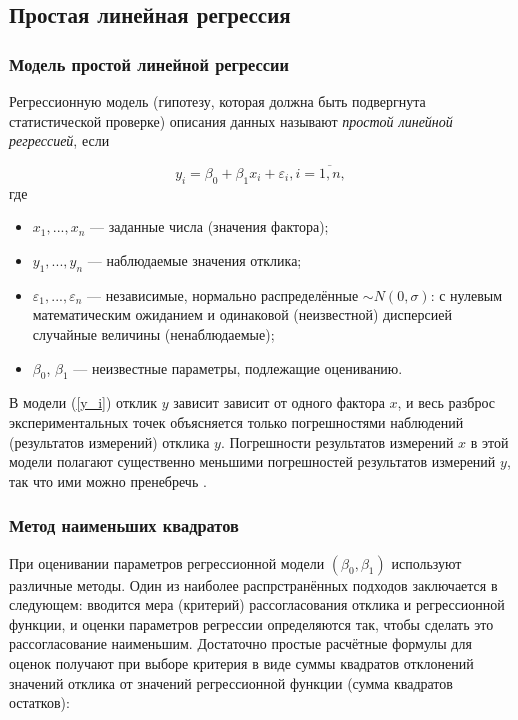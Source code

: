 \documentclass[../body.tex]{subfiles}
\begin{document}
	\subsection{Простая линейная регрессия}
	\subsubsection{Модель простой линейной регрессии}
	Регрессионную модель (гипотезу, которая должна быть подвергнута статистической проверке) описания данных называют \textit{простой линейной регрессией}, если
	
	\begin{equation}
		y_{i} = \beta_{0} + \beta_{1}x_{i} + \varepsilon_{i},  i = \overline{1, n},
		\label{y_i}
	\end{equation}
	где \begin{itemize}
		\item$x_{1},...,x_{n}$ — заданные числа (значения фактора);
		\item $y_{1},...,y_{n}$ — наблюдаемые значения отклика;
		\item $\varepsilon_{1},...,\varepsilon_{n}$ — независимые, нормально распределённые $\sim N(0,\sigma)$: с нулевым математическим ожиданием и одинаковой (неизвестной) дисперсией случайные величины (ненаблюдаемые);
		\item $\beta_{0}$, $\beta_{1}$ — неизвестные параметры, подлежащие оцениванию.
	\end{itemize}
	В модели (\ref{y_i}) отклик $y$ зависит зависит от одного фактора $x$, и весь разброс экспериментальных точек объясняется только погрешностями наблюдений (результатов измерений) отклика $y$. Погрешности результатов измерений $x$ в этой модели полагают существенно меньшими погрешностей результатов измерений $y$, так что ими можно пренебречь \cite[c.~507]{max}.
	
	
	
	\subsubsection{Метод наименьших квадратов}
	При оценивании параметров регрессионной модели $(\beta_{0}, \beta_{1})$ используют различные методы. Один из наиболее распрстранённых подходов заключается в следующем: вводится мера (критерий) рассогласования отклика и регрессионной функции, и оценки параметров регрессии определяются так, чтобы сделать это рассогласование наименьшим. Достаточно простые расчётные формулы для оценок получают при выборе критерия в виде суммы квадратов отклонений значений отклика от значений регрессионной функции (сумма квадратов остатков):
	
\end{document}

